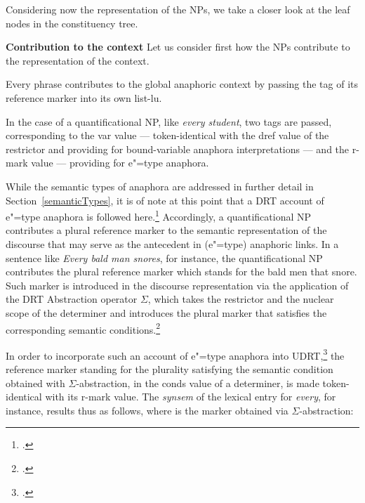 \documentclass[output=paper
,modfonts
,nonflat]{langsci/langscibook}
\begin{document}
Considering now the representation of the NPs,
we take a closer look at the leaf nodes in the constituency tree. 

\textbf{Contribution to the context} Let us
consider first how the NPs contribute to the representation of
the context.

Every phrase contributes 
to the global anaphoric context by passing 
the tag of its reference marker into its own {\sc list-lu}.  

In the case of a quantificational NP, like
\emph{every student}, two tags are passed, corresponding to the 
{\sc var} value 
 --- token-identical
with the {\sc dref} value of the restrictor and
providing for bound-variable anaphora interpretations --- and the
{\sc r-mark} value
 --- providing for
e"=type anaphora. 

While the semantic types of anaphora are addressed in further detail in Section~\ref{semanticTypes},
it is of note at this point that a DRT account of e"=type anaphora is followed here.\footnote{
\citep[p.311ff]{kamp:drt93}.} 
Accordingly, a quantificational NP contributes a plural reference marker to the
semantic representation of the discourse that may serve as the antecedent in (e"=type) 
anaphoric links. In a sentence like \emph{Every bald man snores}, for instance,
the quantificational NP contributes 
the plural reference marker which stands for the bald
men that snore. Such marker is introduced in the discourse representation
via the application of the DRT Abstraction operator $\Sigma$, which
takes the restrictor and the nuclear scope of the determiner and
introduces the plural marker that satisfies the corresponding
semantic conditions.\footnote{
\citep[p.310]{kamp:drt93}.}


In order to incorporate such an account of e"=type anaphora
into UDRT,\footnote{
\citep{frank:sem95}.} 
the reference marker standing for the plurality
satisfying the semantic condition obtained with  
\mbox{$\Sigma$-abstraction}, in the {\sc conds} value of a determiner, 
is made token-identical with its {\sc r-mark} value. The \emph{synsem} of the
lexical  entry for \emph{every}, for instance, results thus as follows, where
is the marker obtained
via 
\mbox{$\Sigma$-abstraction}:
\end{document}
